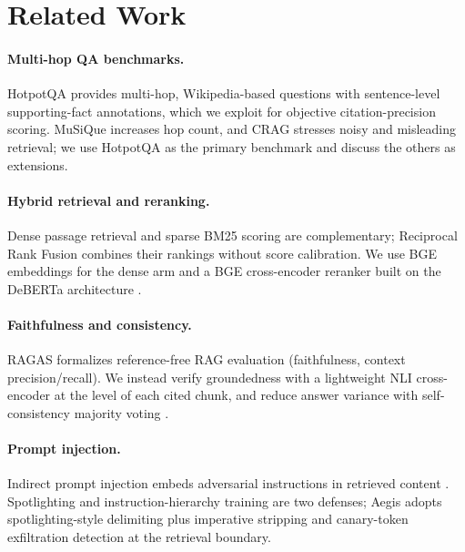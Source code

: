 \documentclass[twocolumn,10pt]{article}
\begin{document}
\section{Related Work}
\label{sec:related}

\paragraph{Multi-hop QA benchmarks.}
HotpotQA \citep{yang2018hotpotqa} provides multi-hop, Wikipedia-based
questions with sentence-level supporting-fact annotations, which we exploit
for objective citation-precision scoring. MuSiQue \citep{trivedi2022musique}
increases hop count, and CRAG \citep{yang2024crag} stresses noisy and
misleading retrieval; we use HotpotQA as the primary benchmark and discuss
the others as extensions.

\paragraph{Hybrid retrieval and reranking.}
Dense passage retrieval \citep{karpukhin2020dpr} and sparse BM25 scoring
\citep{robertson2009bm25} are complementary; Reciprocal Rank Fusion
\citep{cormack2009rrf} combines their rankings without score calibration. We
use BGE embeddings \citep{xiao2024cpack} for the dense arm and a BGE
cross-encoder reranker built on the DeBERTa architecture
\citep{he2021deberta}.

\paragraph{Faithfulness and consistency.}
RAGAS \citep{es2024ragas} formalizes reference-free RAG evaluation
(faithfulness, context precision/recall). We instead verify groundedness with
a lightweight NLI cross-encoder \citep{he2021deberta} at the level of each
cited chunk, and reduce answer variance with self-consistency majority voting
\citep{wang2023selfconsistency}.

\paragraph{Prompt injection.}
Indirect prompt injection embeds adversarial instructions in retrieved
content \citep{greshake2023injection}. Spotlighting
\citep{hines2024spotlighting} and instruction-hierarchy training
\citep{wallace2024instructionhierarchy} are two defenses; Aegis adopts
spotlighting-style delimiting plus imperative stripping and canary-token
exfiltration detection at the retrieval boundary.
\end{document}
